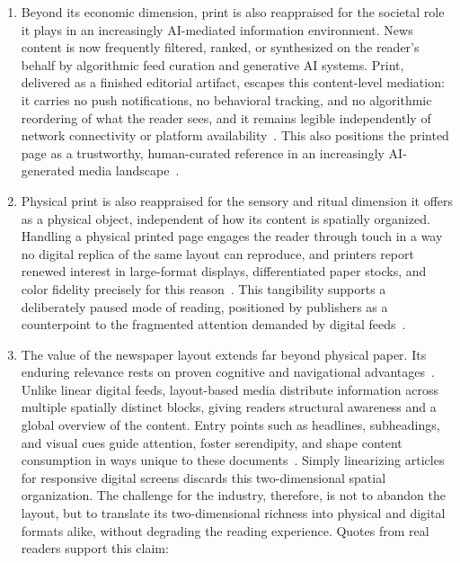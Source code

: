 \begin{enumerate}

    \item Beyond its economic dimension, print is also reappraised for the societal role it plays in an increasingly AI-mediated information environment. News content is now frequently filtered, ranked, or synthesized on the reader's behalf by algorithmic feed curation and generative AI systems. Print, delivered as a finished editorial artifact, escapes this content-level mediation: it carries no push notifications, no behavioral tracking, and no algorithmic reordering of what the reader sees, and it remains legible independently of network connectivity or platform availability~\cite{beyond-print-comeback-2026}. This also positions the printed page as a trustworthy, human-curated reference in an increasingly AI-generated media landscape~\cite{presse-medias-futur-2025}.

    \item Physical print is also reappraised for the sensory and ritual dimension it offers as a physical object, independent of how its content is spatially organized. Handling a physical printed page engages the reader through touch in a way no digital replica of the same layout can reproduce, and printers report renewed interest in large-format displays, differentiated paper stocks, and color fidelity precisely for this reason~\cite{presse-medias-futur-2025}. This tangibility supports a deliberately paused mode of reading, positioned by publishers as a counterpoint to the fragmented attention demanded by digital feeds~\cite{beyond-print-comeback-2026,presse-medias-futur-2025}.

    \item The value of the newspaper layout extends far beyond physical paper. Its enduring relevance rests on proven cognitive and navigational advantages~\cite{ozretic_dosen_key_2018, hollander_e-reader_2011, holsanova_entry_2006}. Unlike linear digital feeds, layout-based media distribute information across multiple spatially distinct blocks, giving readers structural awareness and a global overview of the content. Entry points such as headlines, subheadings, and visual cues guide attention, foster serendipity, and shape content consumption in ways unique to these documents~. Simply linearizing articles for responsive digital screens discards this two-dimensional spatial organization. The challenge for the industry, therefore, is not to abandon the layout, but to translate its two-dimensional richness into physical and digital formats alike, without degrading the reading experience. Quotes from real readers support this claim:
    

\end{enumerate}
